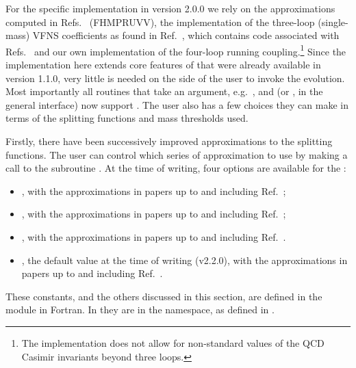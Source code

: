 For the specific implementation in \hoppet version 2.0.0 we rely on
the approximations computed in
Refs.~\cite{Davies:2016jie,Moch:2017uml,Falcioni:2023luc,Falcioni:2023vqq,Moch:2023tdj,Falcioni:2024xyt,Falcioni:2024qpd,Falcioni:2025hfz} (FHMPRUVV),
the implementation of the three-loop (single-mass) VFNS coefficients as found in
Ref.~\cite{BlumleinCode}, which contains code associated with
Refs.~\cite{Ablinger:2024xtt,Fael:2022miw} and our own implementation
of the four-loop running coupling.\footnote{The implementation does
not allow for non-standard values of the QCD Casimir invariants beyond
three loops.}
%
Since the implementation here extends core features of \hoppet that
were already available in version 1.1.0, very little is needed on the
side of the user to invoke the evolution.
%
Most importantly all routines that take an  argument,
e.g.\ , and  (or
,  in the general
interface)  now support .
%
The user also has a few choices they can make in terms of the
splitting functions and mass thresholds used.


Firstly, there have been successively improved approximations to the
splitting functions.
%
The user can control which series of approximation to use by making a
call to the subroutine .
%
At the time of writing, four options are available for the :
%
\begin{itemize}
\item {}, with the
  approximations in papers up to and including Ref.~\cite{Moch:2023tdj};
\item {}, with the
  approximations in papers up to and including
  Ref.~\cite{Falcioni:2024xyt};
\item {}, with the approximations in papers up to and including
  Ref.~\cite{Falcioni:2024qpd}.
\item {}, the default value at the time of
  writing (v2.2.0), with the approximations in papers up to and including
  Ref.~\cite{Falcioni:2025hfz}.
\end{itemize}
These constants, and the others discussed in this section, are defined
in the  module in
Fortran.
%
In \CPP they are in the  namespace, as defined in
.

